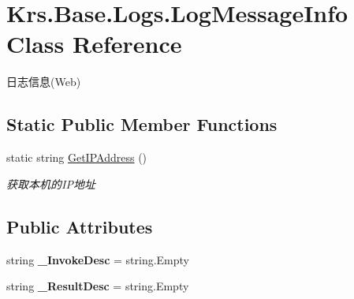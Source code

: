 \hypertarget{class_krs_1_1_base_1_1_logs_1_1_log_message_info}{\section{Krs.\-Base.\-Logs.\-Log\-Message\-Info Class Reference}
\label{class_krs_1_1_base_1_1_logs_1_1_log_message_info}
}


日志信息(\-Web)  


\subsection*{Static Public Member Functions}
\begin{DoxyCompactItemize}
\item 
static string \hyperlink{class_krs_1_1_base_1_1_logs_1_1_log_message_info_afbf204bbc7164a8863b15bbae78d97bb}{Get\-I\-P\-Address} ()
\begin{DoxyCompactList}\small\item\em 获取本机的\-I\-P地址 \end{DoxyCompactList}\end{DoxyCompactItemize}
\subsection*{Public Attributes}
\begin{DoxyCompactItemize}
\item 
\hypertarget{class_krs_1_1_base_1_1_logs_1_1_log_message_info_a690988c88303f2b9e568dec35abee06a}{string {\bfseries \-\_\-\-Invoke\-Desc} = string.\-Empty}\label{class_krs_1_1_base_1_1_logs_1_1_log_message_info_a690988c88303f2b9e568dec35abee06a}

\item 
\hypertarget{class_krs_1_1_base_1_1_logs_1_1_log_message_info_aec2e01758d11817fba8afdf59ada7c47}{string {\bfseries \-\_\-\-Result\-Desc} = string.\-Empty}\label{class_krs_1_1_base_1_1_logs_1_1_log_message_info_aec2e01758d11817fba8afdf59ada7c47}

\end{DoxyCompactItemize}
